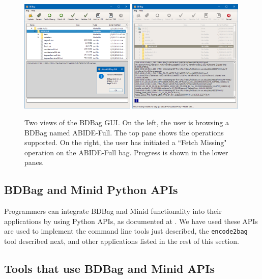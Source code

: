 \documentclass[11pt]{article}
\begin{document}
\begin{figure}
\centering
\includegraphics[width=0.49\textwidth]{figs/bdbag_gui_version.png}
\includegraphics[width=0.49\textwidth]{figs/bdbag_gui_fetch.png}
\caption{Two views of the BDBag GUI. 
On the left, the user is browsing a BDBag named ABIDE-Full. The top pane shows the operations
supported. On the right, the user has initiated a ``Fetch Missing" operation on the ABIDE-Full
bag. Progress is shown in the lower panes.\label{fig:gui}}
\end{figure}

\subsection{BDBag and Minid Python APIs} 

Programmers can integrate BDBag and Minid functionality into their applications by using
Python APIs, as documented at .
We have used these APIs are used to implement the command line tools just described,
the \texttt{encode2bag} tool described next, and other applications listed in the rest of this section. 


\subsection{Tools that use BDBag and Minid APIs}
\end{document}

